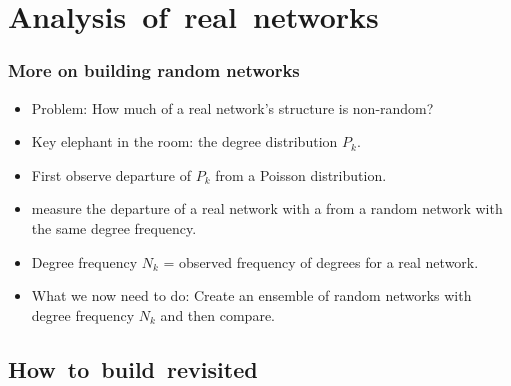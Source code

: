 \section{Analysis\ of\ real\ networks}

\begin{frame}[label=]
  \frametitle{More on building random networks}

  \begin{itemize}
  \item<1-> 
    \alert{Problem:} 
    How much of a real network's structure is non-random?
  \item<2-> 
    Key elephant in the room: the \alert{degree distribution} $P_k$.
  \item<3-> 
    First observe \alert{departure} of $P_k$ from a Poisson distribution.
  \item<4->
    measure the departure of a real network 
    with a 
    from a random
    network with the same degree frequency.
  \item<5->
    Degree frequency $N_k$ = observed frequency of degrees for a real network.
  \item<6-> 
    \alert{What we now need to do}: 
    Create an ensemble of random networks
    with degree frequency $N_k$ and then compare.
  \end{itemize}

\end{frame}

\subsection{How\ to\ build\ revisited}

